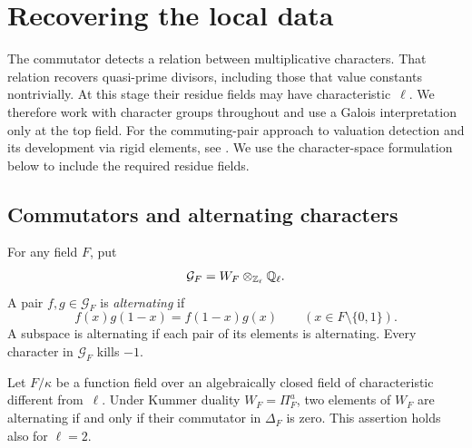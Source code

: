 \section{Recovering the local data}
\label{local:section}

The commutator detects a relation between multiplicative characters.
That relation recovers quasi-prime divisors, including those that value
constants nontrivially.  At this stage their residue fields may have
characteristic~$\ell$.  We therefore work with character groups throughout
and use a Galois interpretation only at the top field.
For the commuting-pair approach to valuation detection and its
development via rigid elements, see
\cite{Bogomolov1991,BT2002,TopazCL2017}.
We use the character-space formulation below to include the required
residue fields.

\subsection{Commutators and alternating characters}

For any field $F$, put
\[
 \mathcal G_F=W_F\otimes_{\mathbb Z_\ell}\mathbb Q_\ell.
\]
A pair $f,g\in\mathcal G_F$ is \emph{alternating} if
\begin{equation}\label{local:alternating}
 f(x)g(1-x)=f(1-x)g(x)\qquad(x\in F\setminus\{0,1\}).
\end{equation}
A subspace is alternating if each pair of its elements is alternating.
Every character in $\mathcal G_F$ kills $-1$.

\begin{lemma}\label{local:commuting}
Let $F/\kappa$ be a function field over an algebraically closed field
of characteristic different from~$\ell$.  Under Kummer duality $W_F=\Pi_F^a$, two elements of $W_F$
are alternating if and only if their commutator in $\Delta_F$ is zero.
This assertion holds also for $\ell=2$.
\end{lemma}


